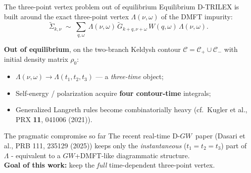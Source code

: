 \documentclass[10pt,aspectratio=169]{beamer}
\newcommand{\dgw}{D\nobreakdash-$GW$}
\begin{document}
\begin{frame}{The three-point vertex problem out of equilibrium}
  Equilibrium D-TRILEX is built around the exact three-point vertex
  $\Lambda(\nu,\omega)$ of the DMFT impurity:
  \[
    \tilde\Sigma_{k,\nu}
    \;\sim\;
    \sum_{q,\omega}\,
    \Lambda(\nu,\omega)\,
    \tilde G_{k+q,\nu+\omega}\,
    W(q,\omega)\,
    \Lambda(\nu,\omega).
  \]
  \medskip

  \textbf{Out of equilibrium}, on the two-branch Keldysh contour
  $\mathcal{C}=\mathcal{C}_+\cup\mathcal{C}_-$ with initial density
  matrix $\rho_0$:
  \begin{itemize}
    \item $\Lambda(\nu,\omega) \to \Lambda(t_1,t_2,t_3)$ — a \emph{three-time} object;
    \item Self-energy / polarization acquire \textbf{four contour-time}
          integrals;
    \item Generalized Langreth rules become combinatorially heavy
          (cf.\ Kugler et al., PRX {\bf 11}, 041006 (2021)).
  \end{itemize}

  \begin{alertblock}{The pragmatic compromise so far}
    The recent real-time \dgw\ paper (Dasari et al., PRB 111, 235129 (2025)) keeps only the
    \emph{instantaneous} ($t_1=t_2=t_3$) part of $\Lambda$ - equivalent
    to a $GW$+DMFT-like diagrammatic structure.\\
    \textbf{Goal of this work:} keep the \emph{full} time-dependent
    three-point vertex.
  \end{alertblock}
\end{frame}
\end{document}
